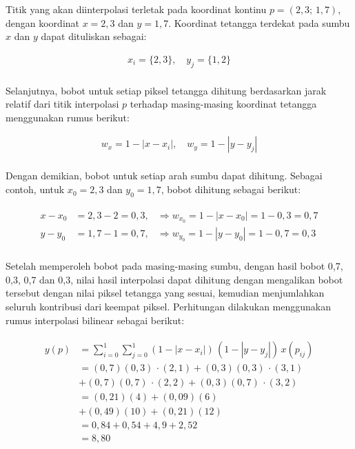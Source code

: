 \bigskip
Titik yang akan diinterpolasi terletak pada koordinat kontinu $p = (2{,}3;\,1{,}7)$, dengan koordinat $x = 2{,}3$ dan $y = 1{,}7$. Koordinat tetangga terdekat pada sumbu $x$ dan $y$ dapat dituliskan sebagai:

\begin{align*}
    x_i = \{2, 3\}, \quad y_j = \{1, 2\} \\
\end{align*}

Selanjutnya, bobot untuk setiap piksel tetangga dihitung berdasarkan jarak relatif dari titik interpolasi $p$ terhadap masing-masing koordinat tetangga menggunakan rumus berikut:

\begin{align*}
    w_x = 1 - |x - x_i|, \quad w_y = 1 - |y - y_j| \\[0.5em]
\end{align*}

Dengan demikian, bobot untuk setiap arah sumbu dapat dihitung. Sebagai contoh, untuk $x_0 = 2,3$ dan $y_0 = 1,7$, bobot dihitung sebagai berikut:

\begin{align*}
\begin{aligned}
x - x_0 &= 2{,}3 - 2 = 0{,}3, & \Rightarrow w_{x_0} = 1 - |x - x_0| = 1 - 0{,}3 = 0{,}7 \\[0.5em]
y - y_0 &= 1{,}7 - 1 = 0{,}7, & \Rightarrow w_{y_0} = 1 - |y - y_0| = 1 - 0{,}7 = 0{,}3 \\[0.8em]
\end{aligned}
\end{align*}

\bigskip
Setelah memperoleh bobot pada masing-masing sumbu, dengan hasil bobot 0{,}7, 0{,}3, 0{,}7 dan 0{,}3, nilai hasil interpolasi dapat dihitung dengan mengalikan bobot tersebut dengan nilai piksel tetangga yang sesuai, kemudian menjumlahkan seluruh kontribusi dari keempat piksel. Perhitungan dilakukan menggunakan rumus interpolasi bilinear sebagai berikut:
\medskip

\begin{align*}
\begin{aligned}
y(p) &= \sum_{i=0}^{1} \sum_{j=0}^{1} (1 - |x - x_i|)\,(1 - |y - y_j|)\,x(p_{ij}) \\[0.5em]
 &= (0{,}7)(0{,}3)\,\cdot(2,1) + (0{,}3)(0{,}3)\,\cdot(3,1) \\[0.5em]
     &+ (0{,}7)(0{,}7)\,\cdot(2,2) + (0{,}3)(0{,}7)\,\cdot(3,2)\\[0.5em]
 &= (0{,}21)(4) + (0{,}09)(6) \\[0.5em]
     &+ (0{,}49)(10) + (0{,}21)(12) \\[0.5em]
 &= 0{,}84 + 0{,}54 + 4{,}9 + 2{,}52 \\[0.5em]
 &= 8{,}80 \\[0.8em]
\end{aligned}
\end{align*}

